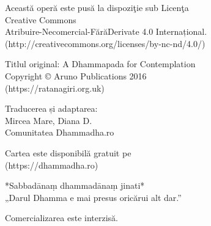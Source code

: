 \cleartorecto
{\tiny\setlength{\parindent}{0pt}%
\raggedright\label{copyright-details}
\setlength{\parskip}{5pt}
{\centering

{\large\ccbyncnd}

Această operă este pusă la dispoziţie sub Licenţa\\
Creative Commons\\
Atribuire-Necomercial-FărăDerivate 4.0 Internațional.\\
[http://creativecommons.org/licenses/by-nc-nd/4.0/](http://creativecommons.org/licenses/by-nc-nd/4.0/)

Titlul original: A Dhammapada for Contemplation\\
Copyright © Aruno Publications 2016\\
[https://ratanagiri.org.uk](https://ratanagiri.org.uk)

Traducerea și adaptarea:\\
Mircea Mare, Diana D.\\
Comunitatea Dhammadha.ro

Cartea este disponibilă gratuit pe\\
[https://dhammadha.ro](https://dhammadha.ro)

*Sabbadānaṃ dhammadānaṃ jinati*\\
„Darul Dhamma e mai presus oricărui alt dar.”

Comercializarea este interzisă.

}

}
